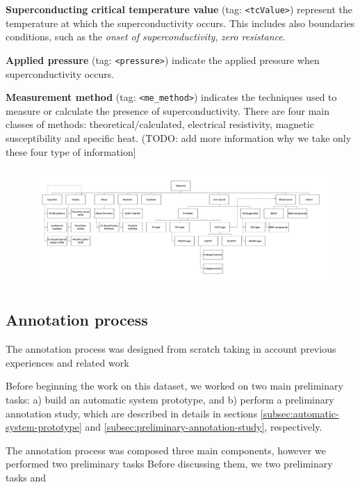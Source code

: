 \documentclass[a4paper,10pt]{article}
\begin{document}
\textbf{Superconducting critical temperature value} (tag: \texttt{<tcValue>}) represent the temperature at which the superconductivity occurs. This includes also boundaries conditions, such as the \textit{onset of superconductivity}, \textit{zero resistance}. 

\textbf{Applied pressure} (tag: \texttt{<pressure>}) indicate the applied pressure when superconductivity occurs. 

\textbf{Measurement method} (tag: \texttt{<me\_method>}) indicates the techniques used to measure or calculate the presence of superconductivity. There are four main classes of methods: theoretical/calculated, electrical resistivity, magnetic susceptibility and specific heat. 
(TODO: add more information why we take only these four type of information]

\begin{figure}[h]
    \centering
    \includegraphics[scale=0.4, angle=90]{classes-superconductors-hierarchy}
    \label{fig:class-hierachy}
\end{figure}

\subsection{Annotation process}
\label{sec:annotation-process}
The annotation process was designed from scratch taking in account previous experiences and related work~\cite{dieb}

Before beginning the work on this dataset, we worked on two main preliminary tasks: a) build an automatic system prototype, and b) perform a preliminary annotation study, which are described in details in sections \ref{subsec:automatic-system-prototype} and \ref{subsec:preliminary-annotation-study}, respectively.

The annotation process was  composed three main components, however we performed two preliminary tasks Before discussing them, we  two preliminary tasks and 
\end{document}
